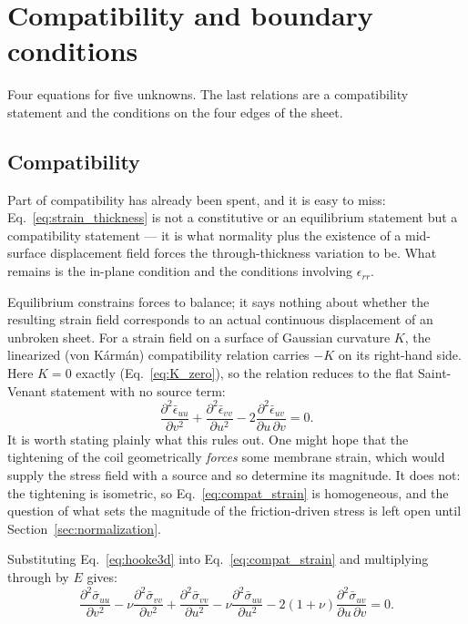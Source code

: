\documentclass[11pt]{article}
\begin{document}
\section{Compatibility and boundary conditions}\label{sec:compat}
Four equations for five unknowns. The last relations are a compatibility
statement and the conditions on the four edges of the sheet.

\subsection{Compatibility}\label{sec:compat_sec}
Part of compatibility has already been spent, and it is easy to miss:
Eq.~\eqref{eq:strain_thickness} is not a constitutive or an equilibrium
statement but a compatibility statement --- it is what normality plus the
existence of a mid-surface displacement field forces the through-thickness
variation to be. What remains is the in-plane condition and the conditions
involving $\epsilon_{rr}$.

Equilibrium constrains forces to balance; it says nothing about whether the
resulting strain field corresponds to an actual continuous displacement of an
unbroken sheet. For a strain field on a surface of Gaussian curvature $K$, the
linearized (von K\'arm\'an) compatibility relation carries $-K$ on its
right-hand side. Here $K = 0$ exactly (Eq.~\ref{eq:K_zero}), so the relation
reduces to the flat Saint-Venant statement with no source term:
\begin{equation}\label{eq:compat_strain}
    \boxed{\;\frac{\partial^{2} \bar\epsilon_{uu}}{\partial v^{2}}
      + \frac{\partial^{2} \bar\epsilon_{vv}}{\partial u^{2}}
      - 2\frac{\partial^{2} \bar\epsilon_{uv}}{\partial u\,\partial v} = 0.\;}
\end{equation}
It is worth stating plainly what this rules out. One might hope that the
tightening of the coil geometrically \emph{forces} some membrane strain, which
would supply the stress field with a source and so determine its magnitude. It
does not: the tightening is isometric, so Eq.~\eqref{eq:compat_strain} is
homogeneous, and the question of what sets the magnitude of the friction-driven
stress is left open until Section~\ref{sec:normalization}.

Substituting Eq.~\eqref{eq:hooke3d} into Eq.~\eqref{eq:compat_strain} and
multiplying through by $E$ gives:
\begin{equation}\label{eq:compat_stress}
    \boxed{\;
    \frac{\partial^{2} \bar\sigma_{uu}}{\partial v^{2}}
    - \nu\frac{\partial^{2} \bar\sigma_{vv}}{\partial v^{2}}
    + \frac{\partial^{2} \bar\sigma_{vv}}{\partial u^{2}}
    - \nu\frac{\partial^{2} \bar\sigma_{uu}}{\partial u^{2}}
    - 2\left(1+\nu\right)
      \frac{\partial^{2} \bar\sigma_{uv}}{\partial u\,\partial v} = 0.\;}
\end{equation}
\end{document}
